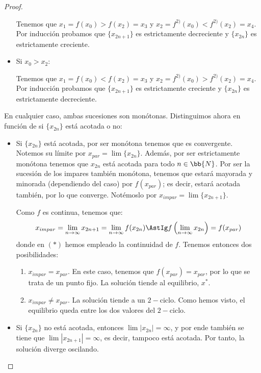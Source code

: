 \begin{ejercicio*}
\begin{proof}
\begin{itemize}
        Tenemos que $x_1=f(x_0)>f(x_2)=x_3$ y $x_2=f^{2)}(x_0)<f^{2)}(x_2)=x_4$. Por inducción probamos que $\{x_{2n+1}\}$ es estrictamente decreciente y $\{x_{2n}\}$ es estrictamente creciente.

        \item Si $x_0>x_2$:

        Tenemos que $x_1=f(x_0)<f(x_2)=x_3$ y $x_2=f^{2)}(x_0)>f^{2)}(x_2)=x_4$. Por inducción probamos que $\{x_{2n+1}\}$ es estrictamente creciente y $\{x_{2n}\}$ es estrictamente decreciente.
    \end{itemize}

    En cualquier caso, ambas sucesiones son monótonas. Distinguimos ahora en función de si $\{x_{2n}\}$ está acotada o no:
    \begin{itemize}
        \item Si $\{x_{2n}\}$ está acotada, por ser monótona tenemos que es convergente. Notemos su límite por $x_{par}=\lim \{x_{2n}\}$. Además, por ser estrictamente monótona tenemos que $x_{2n}$ está acotada para todo $n\in \bb{N}$. Por ser la sucesión de los impares también monótona, tenemos que estará mayorada y minorada (dependiendo del caso) por $f(x_{par})$; es decir, estará acotada también, por lo que converge. Notémoslo por $x_{impar}=\lim \{x_{2n+1}\}$.

        Como $f$ es continua, tenemos que:
        \begin{equation*}
            x_{impar} = \lim_{n\to \infty} x_{2n+1} = \lim_{n\to \infty} f(x_{2n})
            \AstIg f\left(\lim_{n\to \infty} x_{2n}\right) = f(x_{par})
        \end{equation*}
        donde en $(\ast)$ hemos empleado la continuidad de $f$. Tenemos entonces dos posibilidades:
        \begin{enumerate}
            \item $x_{impar}=x_{par}$. En este caso, tenemos que $f(x_{par})=x_{par}$, por lo que se trata de un punto fijo. La solución tiende al equilibrio, $x^\ast$.
            \item $x_{impar}\neq x_{par}$. La solución tiende a un $2-$ciclo. Como hemos visto, el equilibrio queda entre los dos valores del $2-$ciclo.
        \end{enumerate}

        \item Si $\{x_{2n}\}$ no está acotada, entonces $\lim |x_{2n}|=\infty$, y por ende también se tiene que $\lim |x_{2n+1}|=\infty$, es decir, tampoco está acotada. Por tanto, la solución diverge oscilando.
    \end{itemize}
    \end{proof}
\end{ejercicio*}\hspace{1cm}

